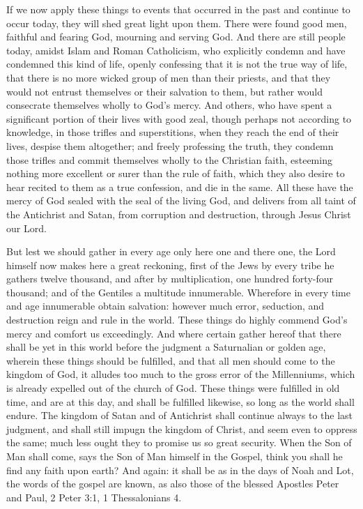 If we now apply these things to events that occurred in the past and continue to occur today, they will shed great light upon them. There were found good men, faithful and fearing God, mourning and serving God. And there are still people today, amidst Islam and Roman Catholicism, who explicitly condemn and have condemned this kind of life, openly confessing that it is not the true way of life, that there is no more wicked group of men than their priests, and that they would not entrust themselves or their salvation to them, but rather would consecrate themselves wholly to God’s mercy. And others, who have spent a significant portion of their lives with good zeal, though perhaps not according to knowledge, in those trifles and superstitions, when they reach the end of their lives, despise them altogether; and freely professing the truth, they condemn those trifles and commit themselves wholly to the Christian faith, esteeming nothing more excellent or surer than the rule of faith, which they also desire to hear recited to them as a true confession, and die in the same. All these have the mercy of God sealed with the seal of the living God, and delivers from all taint of the Antichrist and Satan, from corruption and destruction, through Jesus Christ our Lord.

But lest we should gather in every age only here one and there one, the Lord himself now makes here a great reckoning, first of the Jews by every tribe he gathers twelve thousand, and after by multiplication, one hundred forty-four thousand; and of the Gentiles a multitude innumerable. Wherefore in every time and age innumerable obtain salvation: however much error, seduction, and destruction reign and rule in the world. These things do highly commend God’s mercy and comfort us exceedingly. And where certain gather hereof that there shall be yet in this world before the judgment a Saturnalian or golden age, wherein these things should be fulfilled, and that all men should come to the kingdom of God, it alludes too much to the gross error of the Millenniums, which is already expelled out of the church of God. These things were fulfilled in old time, and are at this day, and shall be fulfilled likewise, so long as the world shall endure. The kingdom of Satan and of Antichrist shall continue always to the last judgment, and shall still impugn the kingdom of Christ, and seem even to oppress the same; much less ought they to promise us so great security. When the Son of Man shall come, says the Son of Man himself in the Gospel, think you shall he find any faith upon earth? And again: it shall be as in the days of Noah and Lot, the words of the gospel are known, as also those of the blessed Apostles Peter and Paul, 2 Peter 3:1, 1 Thessalonians 4.

